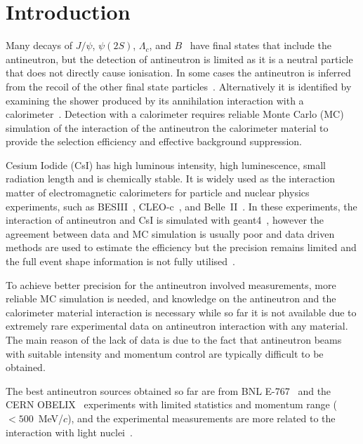 \documentclass[aps,preprint,showkeys,superscriptaddress]{revtex4}
\begin{document}
\maketitle

\section{Introduction}

Many decays of $J/\psi$, $\psi(2S)$, $\Lambda_c$, and $B$~\cite{pdg} have final
states that include the antineutron, but the detection of antineutron is
limited as it is a neutral particle that does not directly cause ionisation.
In some cases the antineutron is inferred from the recoil of the other final
state particles~\cite{BESIII:2012imn,CLEO:2008aum}.  Alternatively it is
identified by examining the shower produced by its annihilation interaction 
with a calorimeter~\cite{BESIII:2021tbq}.  Detection with a calorimeter requires
reliable Monte Carlo (MC) simulation of the interaction of the antineutron the
calorimeter material to provide the selection efficiency and effective
background suppression. 

Cesium Iodide (CsI) has high luminous intensity, high luminescence, small
radiation length and is chemically stable. It is widely used as the
interaction matter of electromagnetic calorimeters for particle and nuclear
physics experiments, such as BESIII~\cite{bes3}, CLEO-c~\cite{cleoc}, and
Belle~II~\cite{belle2}. In these experiments, the interaction of antineutron
and CsI is simulated with {\sc geant4}~\cite{geant4}, however the agreement
between data and MC simulation is usually poor and data driven methods are used
to estimate the efficiency but the precision remains
limited and the full event shape information is not fully utilised~\cite{Liu:2021rrx}.  

To achieve better precision for the antineutron involved measurements, more
reliable MC simulation is needed, and knowledge on the antineutron and the
calorimeter material interaction is necessary while so far it is not available
due to extremely rare experimental data on antineutron interaction with any
material. The main reason of the lack of data is due to the fact that
antineutron beams with suitable intensity and momentum control are typically
difficult to be obtained. 

The best antineutron sources obtained so far are from
BNL E-767~\cite{E767} and the CERN OBELIX~\cite{OBELIX} experiments with
limited statistics and momentum range ($<500$~MeV/$c$), and the experimental
measurements are more related to the interaction with light nuclei~\cite{nbarPhysics}.
\end{document}
